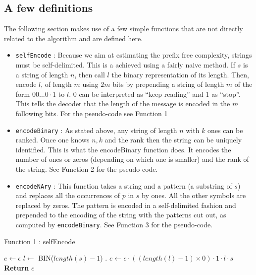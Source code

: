 \documentclass[12pt]{amsart}
\theoremstyle{definition}
\theoremstyle{remark}
\theoremstyle{definition}
\theoremstyle{remark}
\begin{document}
		\subsection*{A few definitions}

			The following section makes use of a few simple functions that are not directly related to the algorithm and are defined here. 

			\begin{itemize}
				\item \texttt{selfEncode} : Because we aim at estimating the prefix free complexity, strings must be self-delimited. This is a achieved using a
					fairly naive method. If $s$ is a string of length $n$, then call $l$ the binary representation of its length. Then, encode $l$, of length
					$m$ using $2m$ bits by prepending a string of length $m$ of the form $00 \dots 0 \cdot 1$ to $l$. $0$ can be interpreted as ``keep reading''
					and $1$ as ``stop''. This tells the decoder that the length of the message is encoded in the $m$ following bits. For the pseudo-code see Function 1 
				\item \texttt{encodeBinary} : As stated above, any string of length $n$ with $k$ ones can be ranked. Once one knows $n, k$ and the rank then the string
					can be uniquely identified. This is what the encodeBinary function does. It encodes the number of ones or zeros (depending on which one is smaller) and the rank of the string. See Function 2 for the pseudo-code.
				\item \texttt{encodeNAry} : This function takes a string and a pattern (a substring of $s$) and replaces all the occurrences of $p$ in $s$ by ones. All the
					other symbols are replaced by zeros. The pattern is encoded in a self-delimited fashion and prepended to the encoding of the string with the patterns cut out, as computed by \texttt{encodeBinary}. See Function 3 for the pseudo-code.
			\end{itemize}

			\begin{algorithm}{Function 1 : selfEncode}
			\begin{algorithmic}
					\State $ e \gets \epsilon$ 
					\State $ l \gets $ BIN($length(s) - 1$) . 
					\State $ e \gets e \cdot ((length(l) - 1) \times 0) \cdot 1 \cdot l \cdot s$
					\State \textbf{Return} $e$
				\EndFunction
			\end{algorithmic}
		\end{algorithm}
	
\end{document}
